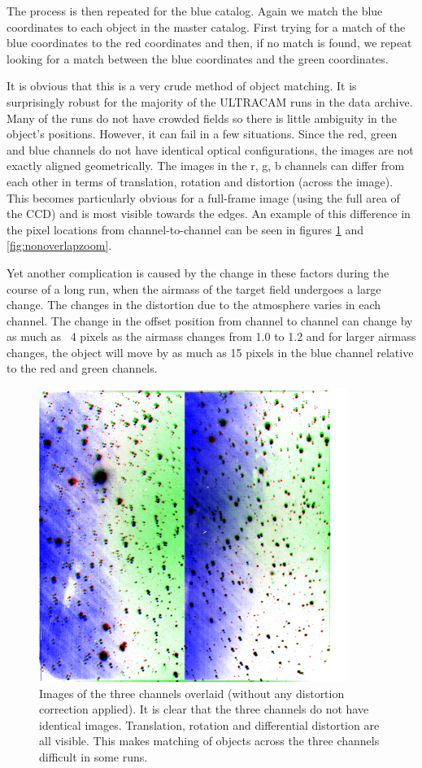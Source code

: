 The process is then repeated for the blue catalog. Again we match the blue coordinates to each object in the master catalog. First trying for a match of the blue coordinates to the red coordinates and then, if no match is found, we repeat looking for a match between the blue coordinates and the green coordinates.  

It is obvious that this is a very crude method of object matching. It is surprisingly robust for the majority of the ULTRACAM runs in the data archive. Many of the runs do not have crowded fields so there is little ambiguity in the object's positions. However, it can fail in a few situations. Since the red, green and blue channels do not have identical optical configurations, the images are not exactly aligned geometrically. The images in the r, g, b channels can differ from each other in terms of translation, rotation and distortion (across the image). This becomes particularly obvious for a full-frame image (using the full area of the CCD) and is most visible towards the edges. An example of this difference in the pixel locations from channel-to-channel can be seen in figures \ref{fig:nonoverlap} and \ref{fig:nonoverlapzoom}.

Yet another complication is caused by the change in these factors during the course of a long run, when the airmass of the target field undergoes a large change. The changes in the distortion due to the atmosphere varies in each channel. The change in the offset position from channel to channel can change by as much as ~4 pixels as the airmass changes from 1.0 to 1.2 and for larger airmass changes, the object will move by as much as 15 pixels in the blue channel relative to the red and green channels. 

\begin{figure}
  \centering
  \includegraphics[width=100mm]{images/overlay_multiply.png}
  \caption{Images of the three channels overlaid (without any distortion correction applied). It is clear that the three channels do not have identical images. Translation, rotation and differential distortion are all visible. This makes matching of objects across the three channels difficult in some runs. }
\label{fig:nonoverlap}
\end{figure}

